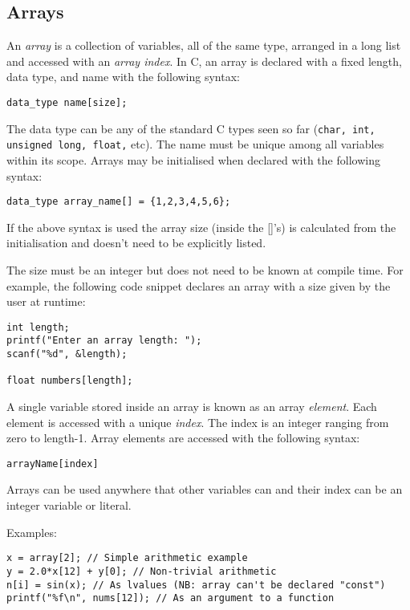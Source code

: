 \documentclass{lab}
\begin{document}
\pagebreak
\subsection{Arrays}

An \textit{array} is a collection of variables, all of the same type, arranged in a long list and accessed with an \textit{array index}. In C, an array is declared with a fixed length, data type, and name with the following syntax:
\begin{lstlisting}[style=Ctable]
data_type name[size];
\end{lstlisting}

The data type can be any of the standard C types seen so far (\texttt{char, int, unsigned long, float,} etc). The name must be unique among all variables within its scope. Arrays may be initialised when declared with the following syntax:

\begin{lstlisting}[style=Ctable]
data_type array_name[] = {1,2,3,4,5,6};
\end{lstlisting}

If the above syntax is used the array size (inside the []'s) is calculated from the initialisation and doesn't need to be explicitly listed.

The size must be an integer but does not need to be known at compile time. For example, the following code snippet declares an array with a size given by the user at runtime:

\begin{lstlisting}[style=CStyle]
int length;
printf("Enter an array length: ");
scanf("%d", &length);

float numbers[length];
\end{lstlisting}

A single variable stored inside an array is known as an array \textit{element}. Each element is accessed with a unique \textit{index}. The index is an integer ranging from zero to length-1. Array elements are accessed with the following syntax:

\begin{lstlisting}[style=Ctable]
arrayName[index]
\end{lstlisting}

Arrays can be used anywhere that other variables can and their index can be an integer variable or literal.

Examples:
\begin{lstlisting}[style=Ctable]
x = array[2]; // Simple arithmetic example
y = 2.0*x[12] + y[0]; // Non-trivial arithmetic
n[i] = sin(x); // As lvalues (NB: array can't be declared "const")
printf("%f\n", nums[12]); // As an argument to a function
\end{lstlisting}
\end{document}
